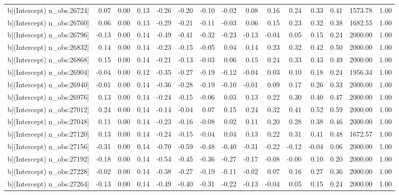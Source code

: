 \begin{table}[ht]
\begin{tabular}{rrrrrrrrrrrrrrr}
  b[(Intercept) n\_obs:26724] & 0.07 & 0.00 & 0.13 & -0.26 & -0.20 & -0.10 & -0.02 & 0.08 & 0.16 & 0.24 & 0.33 & 0.41 & 1573.78 & 1.00 \\ 
  b[(Intercept) n\_obs:26760] & 0.06 & 0.00 & 0.13 & -0.29 & -0.21 & -0.11 & -0.03 & 0.06 & 0.15 & 0.23 & 0.32 & 0.38 & 1682.55 & 1.00 \\ 
  b[(Intercept) n\_obs:26796] & -0.13 & 0.00 & 0.14 & -0.49 & -0.41 & -0.32 & -0.23 & -0.13 & -0.04 & 0.05 & 0.15 & 0.24 & 2000.00 & 1.00 \\ 
  b[(Intercept) n\_obs:26832] & 0.14 & 0.00 & 0.14 & -0.23 & -0.15 & -0.05 & 0.04 & 0.14 & 0.23 & 0.32 & 0.42 & 0.50 & 2000.00 & 1.00 \\ 
  b[(Intercept) n\_obs:26868] & 0.15 & 0.00 & 0.14 & -0.21 & -0.13 & -0.03 & 0.06 & 0.15 & 0.24 & 0.33 & 0.43 & 0.49 & 2000.00 & 1.00 \\ 
  b[(Intercept) n\_obs:26904] & -0.04 & 0.00 & 0.12 & -0.35 & -0.27 & -0.19 & -0.12 & -0.04 & 0.03 & 0.10 & 0.18 & 0.24 & 1956.34 & 1.00 \\ 
  b[(Intercept) n\_obs:26940] & -0.01 & 0.00 & 0.14 & -0.36 & -0.28 & -0.19 & -0.10 & -0.01 & 0.09 & 0.17 & 0.26 & 0.33 & 2000.00 & 1.00 \\ 
  b[(Intercept) n\_obs:26976] & 0.13 & 0.00 & 0.14 & -0.24 & -0.15 & -0.06 & 0.03 & 0.13 & 0.22 & 0.30 & 0.40 & 0.47 & 2000.00 & 1.00 \\ 
  b[(Intercept) n\_obs:27012] & 0.24 & 0.00 & 0.14 & -0.14 & -0.04 & 0.07 & 0.15 & 0.24 & 0.32 & 0.41 & 0.52 & 0.59 & 2000.00 & 1.00 \\ 
  b[(Intercept) n\_obs:27048] & 0.11 & 0.00 & 0.14 & -0.23 & -0.16 & -0.08 & 0.02 & 0.11 & 0.20 & 0.28 & 0.38 & 0.46 & 2000.00 & 1.00 \\ 
  b[(Intercept) n\_obs:27120] & 0.13 & 0.00 & 0.14 & -0.24 & -0.15 & -0.04 & 0.04 & 0.13 & 0.22 & 0.31 & 0.41 & 0.48 & 1672.57 & 1.00 \\ 
  b[(Intercept) n\_obs:27156] & -0.31 & 0.00 & 0.14 & -0.70 & -0.59 & -0.48 & -0.40 & -0.31 & -0.22 & -0.12 & -0.04 & 0.06 & 2000.00 & 1.00 \\ 
  b[(Intercept) n\_obs:27192] & -0.18 & 0.00 & 0.14 & -0.54 & -0.45 & -0.36 & -0.27 & -0.17 & -0.08 & -0.00 & 0.10 & 0.20 & 2000.00 & 1.00 \\ 
  b[(Intercept) n\_obs:27228] & -0.02 & 0.00 & 0.14 & -0.38 & -0.27 & -0.19 & -0.11 & -0.02 & 0.07 & 0.16 & 0.27 & 0.36 & 2000.00 & 1.00 \\ 
  b[(Intercept) n\_obs:27264] & -0.13 & 0.00 & 0.14 & -0.49 & -0.40 & -0.31 & -0.22 & -0.13 & -0.04 & 0.05 & 0.15 & 0.24 & 2000.00 & 1.00 \\ 

\end{tabular}
\end{table}
